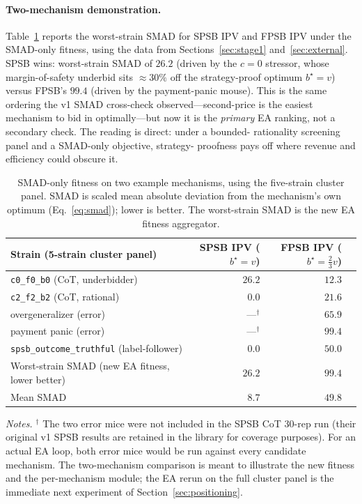 \documentclass[12pt]{article}
\newcommand{\EA}{EA}
\begin{document}
\paragraph{Two-mechanism demonstration.}
Table~\ref{tab:smad-demo} reports the worst-strain SMAD for SPSB IPV
and FPSB IPV under the SMAD-only fitness, using the data from
Sections~\ref{sec:stage1} and~\ref{sec:external}. SPSB wins:
worst-strain SMAD of $26.2$ (driven by the $c{=}0$ stressor, whose
margin-of-safety underbid sits $\approx 30\%$ off the
strategy-proof optimum $b^\star=v$) versus FPSB's $99.4$ (driven
by the payment-panic mouse). This is the same ordering the v1 SMAD
cross-check observed---second-price is the easiest mechanism to bid
in optimally---but now it is the \emph{primary} \EA{} ranking,
not a secondary check. The reading is direct: under a bounded-
rationality screening panel and a SMAD-only objective, strategy-
proofness pays off where revenue and efficiency could obscure it.

\begin{table}[t]
\centering
\caption{SMAD-only fitness on two example mechanisms, using the
five-strain cluster panel. SMAD is scaled mean absolute deviation
from the mechanism's own optimum (Eq.~\eqref{eq:smad}); lower is
better. The worst-strain SMAD is the new \EA{} fitness aggregator.}
\label{tab:smad-demo}
\footnotesize
\setlength{\tabcolsep}{6pt}
\begin{tabular}{@{}lrrr@{}}
\toprule
Strain (5-strain cluster panel) & SPSB IPV ($b^\star=v$) & FPSB IPV ($b^\star=\tfrac{2}{3}v$) \\
\midrule
\texttt{c0\_f0\_b0} (CoT, underbidder)              & $26.2$ & $12.3$ \\
\texttt{c2\_f2\_b2} (CoT, rational)                 & $0.0$  & $21.6$ \\
overgeneralizer (error)                              & ---$^\dagger$  & $65.9$ \\
payment panic (error)                                & ---$^\dagger$  & $99.4$ \\
\texttt{spsb\_outcome\_truthful} (label-follower)    & $0.0$  & $50.0$ \\
\midrule
Worst-strain SMAD (new \EA{} fitness, lower better) & $\mathbf{26.2}$ & $\mathbf{99.4}$ \\
Mean SMAD                                            & $8.7$  & $49.8$ \\
\bottomrule
\end{tabular}

\vspace{0.4em}
\begin{minipage}{0.95\textwidth}
{\footnotesize\textit{Notes.} $^\dagger$ The two error mice were not
included in the SPSB CoT $30$-rep run (their original v1 SPSB results
are retained in the library for coverage purposes). For an actual
\EA{} loop, both error mice would be run against every candidate
mechanism. The two-mechanism comparison is meant to illustrate the
new fitness and the per-mechanism module; the \EA{} rerun on the
full cluster panel is the immediate next experiment of
Section~\ref{sec:positioning}.\par}
\end{minipage}
\end{table}
\end{document}
